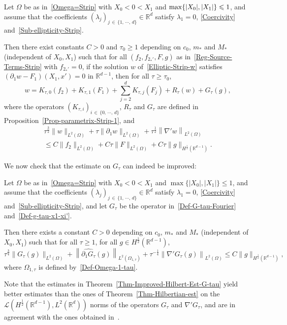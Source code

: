\documentclass[AHL,Unicode,longabstracts]{cedram}
\newcommand{\scL}{\mathscr{L}}
\newcommand*\R{\mathbb{R}}
\renewcommand{\leq}{\leqslant}
\renewcommand{\geq}{\geqslant}
\begin{document}
\begin{prop}\label{Prop-parametrix-Strip-2}
Let $\Omega$ be as in~\eqref{Omega=Strip} with $X_0 \! <\! 0\! <\! X_1$ and $\max\{|X_0|, |X_1|\}\linebreak \leq 1$, and assume that the coefficients $(\lambda_j)_{j\, \in\,\{1,\,\cdots,\,d\}} \in \R^d$ satisfy $\lambda_1 = 0$, \eqref{Coercivity} and~\eqref{Sub-ellipticity-Strip}.

Then there exist constants $C>0$ and $\tau_0 \geq 1$ depending on $c_0$, $m_*$ and $M_*$ (independent of $X_0, X_1$) such that for all $(f_2, f_{2_*'},F,g)$ as in~\eqref{Reg-Source-Terms-Strip} with $f_{2_*'} = 0$, if the solution $w$ of~\eqref{Elliptic-Strip-w} satisfies $(\partial_1 w - F_1)(X_1,x') = 0$ in $\R^{d-1}$, then for all $\tau \geq \tau_0$,
\begin{equation*}
w = K_{\tau,0} (f_2) + K_{\tau,1}(F_1) + \sum_{j = 2}^d K_{\tau,j}(F_j) + R_\tau (w) + G_\tau(g),
\end{equation*}
where the operators $(K_{\tau,i})_{i\, \in\,\{0,\,\cdots,\,d\}}$, $R_\tau$ and $G_\tau$ are defined in Proposition~\ref{Prop-parametrix-Strip-1}, and
\begin{multline*}
\tau^{\frac{3}{2}} \| w \|_{L^2(\Omega)} + \tau \| \partial_1 w \|_{L^2(\Omega)} + \tau^{\frac{1}{2}} \left\| \nabla' w \right\|_{L^2(\Omega)}\\
\leq  C \| f_2 \|_{L^2(\Omega)} + C \tau \| F\|_{L^2(\Omega)} + C \tau \| g \|_{H^{\frac{1}{2}}\left(\R^{d-1}\right)}.
\end{multline*}
\end{prop}


We now check that the estimate on $G_{\tau}$ can indeed be improved:
\begin{theo}\label{Thm-Improved-Hilbert-Est-G-tau}
Let $\Omega$ be as in~\eqref{Omega=Strip} with $X_0 \! <\! 0\! <\! X_1$ and $\max\{|X_0|, |X_1|\} \leq 1$, and assume that the coefficients $(\lambda_j)_{j\,\in\,\{1,\,\cdots,\,d\}} \in \R^d$ satisfy $\lambda_1 = 0$, \eqref{Coercivity} and~\eqref{Sub-ellipticity-Strip}, and let $G_\tau$ be the operator in~\eqref{Def-G-tau-Fourier} and~\eqref{Def-g-tau-x1-xi'}.

Then there exists a constant $C>0$ depending on $c_0$, $m_*$ and $M_*$ (independent of $X_0, X_1$) such that for all $\tau \geq 1$, for all $g \in H^{\frac{1}{2}}(\R^{d-1})$,
\begin{equation*}
\tau^{\frac{3}{4}} \| G_{\tau} (g) \|_{L^2(\Omega)} +
\left\| \widehat{\partial_1 G_\tau} (g) \right\|_{L^2(\Omega_{1, \tau})} +
\tau^{-\frac{1}{4}} \left\| \nabla' G_\tau (g) \right\|_{L^2(\Omega)}
\leq C \| g \|_{H^{\frac{1}{2}}\left(\R^{d-1}\right)},
\end{equation*}
where $\Omega_{1, \tau}$ is defined by~\eqref{Def-Omega-1-tau}.
\end{theo}
\begin{rema}
Note that the estimates in Theorem~\ref{Thm-Improved-Hilbert-Est-G-tau} yield better estimates than the ones of Theorem~\ref{Thm-Hilbertian-est} on the $\scL(H^{\frac{1}{2}}(\R^{d-1}), L^2(\R^d))$ norms of the operators $G_\tau$ and $\nabla' G_{\tau}$, and are in agreement with the ones obtained in~\cite{imanuvilov2003global}.
\end{rema}
\end{document}
